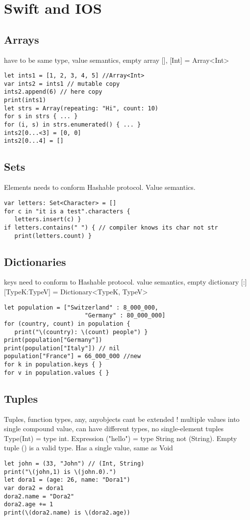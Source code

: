 \section{Swift and IOS}

\subsection{Arrays}
have to be same type, value semantics, empty array [], [Int] = Array<Int>
\begin{lstlisting}
let ints1 = [1, 2, 3, 4, 5] //Array<Int>
var ints2 = ints1 // mutable copy
ints2.append(6) // here copy
print(ints1)
let strs = Array(repeating: "Hi", count: 10)
for s in strs { ... }
for (i, s) in strs.enumerated() { ... }
ints2[0...<3] = [0, 0]
ints2[0...4] = []
\end{lstlisting}

\subsection{Sets}
Elements needs to conform Hashable protocol. Value semantics.
\begin{lstlisting}
var letters: Set<Character> = []
for c in "it is a test".characters {
   letters.insert(c) }
if letters.contains(" ") { // compiler knows its char not str
   print(letters.count) }
\end{lstlisting}

\subsection{Dictionaries}
keys need to conform to Hashable protocol. value semantics, empty dictionary [:]
[TypeK:TypeV] = Dictionary<TypeK, TypeV>
\begin{lstlisting}
let population = ["Switzerland" : 8_000_000,
                       "Germany" : 80_000_000]
for (country, count) in population {
   print("\(country): \(count) people") }
print(population["Germany"])
print(population["Italy"]) // nil
population["France"] = 66_000_000 //new
for k in population.keys { }
for v in population.values { }
\end{lstlisting}

\subsection{Tuples}
Tuples, function types, any, anyobjects cant be extended !
multiple values into single compound value, can have different types, no single-element tuples Type(Int) = type int. Expression ("hello") = type String not (String). Empty tuple () is a valid type. Has a single value, same as Void
\begin{lstlisting}
let john = (33, "John") // (Int, String)
print("\(john,1) is \(john.0).")
let dora1 = (age: 26, name: "Dora1")
var dora2 = dora1
dora2.name = "Dora2"
dora2.age += 1
print(\(dora2.name) is \(dora2.age))
\end{lstlisting}

